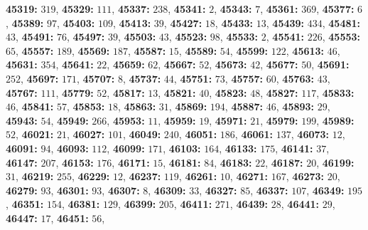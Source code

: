 \textsf{\bfseries 45319:} $319$, \textsf{\bfseries 45329:} $111$, \textsf{\bfseries 45337:} $238$, \textsf{\bfseries 45341:} $2$, \textsf{\bfseries 45343:} $7$, \textsf{\bfseries 45361:} $369$, \textsf{\bfseries 45377:} $6$, \textsf{\bfseries 45389:} $97$, \textsf{\bfseries 45403:} $109$, \textsf{\bfseries 45413:} $39$, \textsf{\bfseries 45427:} $18$, \textsf{\bfseries 45433:} $13$, \textsf{\bfseries 45439:} $434$, \textsf{\bfseries 45481:} $43$, \textsf{\bfseries 45491:} $76$, \textsf{\bfseries 45497:} $39$, \textsf{\bfseries 45503:} $43$, \textsf{\bfseries 45523:} $98$, \textsf{\bfseries 45533:} $2$, \textsf{\bfseries 45541:} $226$, \textsf{\bfseries 45553:} $65$, \textsf{\bfseries 45557:} $189$, \textsf{\bfseries 45569:} $187$, \textsf{\bfseries 45587:} $15$, \textsf{\bfseries 45589:} $54$, \textsf{\bfseries 45599:} $122$, \textsf{\bfseries 45613:} $46$, \textsf{\bfseries 45631:} $354$, \textsf{\bfseries 45641:} $22$, \textsf{\bfseries 45659:} $62$, \textsf{\bfseries 45667:} $52$, \textsf{\bfseries 45673:} $42$, \textsf{\bfseries 45677:} $50$, \textsf{\bfseries 45691:} $252$, \textsf{\bfseries 45697:} $171$, \textsf{\bfseries 45707:} $8$, \textsf{\bfseries 45737:} $44$, \textsf{\bfseries 45751:} $73$, \textsf{\bfseries 45757:} $60$, \textsf{\bfseries 45763:} $43$, \textsf{\bfseries 45767:} $111$, \textsf{\bfseries 45779:} $52$, \textsf{\bfseries 45817:} $13$, \textsf{\bfseries 45821:} $40$, \textsf{\bfseries 45823:} $48$, \textsf{\bfseries 45827:} $117$, \textsf{\bfseries 45833:} $46$, \textsf{\bfseries 45841:} $57$, \textsf{\bfseries 45853:} $18$, \textsf{\bfseries 45863:} $31$, \textsf{\bfseries 45869:} $194$, \textsf{\bfseries 45887:} $46$, \textsf{\bfseries 45893:} $29$, \textsf{\bfseries 45943:} $54$, \textsf{\bfseries 45949:} $266$, \textsf{\bfseries 45953:} $11$, \textsf{\bfseries 45959:} $19$, \textsf{\bfseries 45971:} $21$, \textsf{\bfseries 45979:} $199$, \textsf{\bfseries 45989:} $52$, \textsf{\bfseries 46021:} $21$, \textsf{\bfseries 46027:} $101$, \textsf{\bfseries 46049:} $240$, \textsf{\bfseries 46051:} $186$, \textsf{\bfseries 46061:} $137$, \textsf{\bfseries 46073:} $12$, \textsf{\bfseries 46091:} $94$, \textsf{\bfseries 46093:} $112$, \textsf{\bfseries 46099:} $171$, \textsf{\bfseries 46103:} $164$, \textsf{\bfseries 46133:} $175$, \textsf{\bfseries 46141:} $37$, \textsf{\bfseries 46147:} $207$, \textsf{\bfseries 46153:} $176$, \textsf{\bfseries 46171:} $15$, \textsf{\bfseries 46181:} $84$, \textsf{\bfseries 46183:} $22$, \textsf{\bfseries 46187:} $20$, \textsf{\bfseries 46199:} $31$, \textsf{\bfseries 46219:} $255$, \textsf{\bfseries 46229:} $12$, \textsf{\bfseries 46237:} $119$, \textsf{\bfseries 46261:} $10$, \textsf{\bfseries 46271:} $167$, \textsf{\bfseries 46273:} $20$, \textsf{\bfseries 46279:} $93$, \textsf{\bfseries 46301:} $93$, \textsf{\bfseries 46307:} $8$, \textsf{\bfseries 46309:} $33$, \textsf{\bfseries 46327:} $85$, \textsf{\bfseries 46337:} $107$, \textsf{\bfseries 46349:} $195$, \textsf{\bfseries 46351:} $154$, \textsf{\bfseries 46381:} $129$, \textsf{\bfseries 46399:} $205$, \textsf{\bfseries 46411:} $271$, \textsf{\bfseries 46439:} $28$, \textsf{\bfseries 46441:} $29$, \textsf{\bfseries 46447:} $17$, \textsf{\bfseries 46451:} $56$, 
